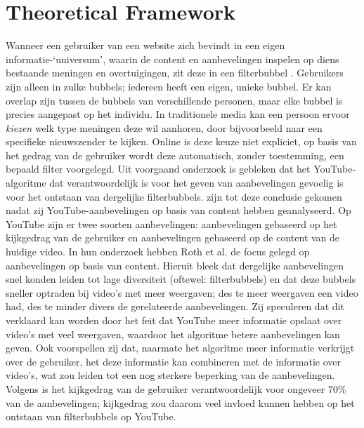 \documentclass[../main.tex]{subfiles}
\begin{document}
\section{Theoretical Framework}
Wanneer een gebruiker van een website zich bevindt in een eigen informatie-‘universum’, waarin de content en aanbevelingen inspelen op diens bestaande meningen en overtuigingen, zit deze in een filterbubbel \citep{pariser2011filter}. Gebruikers zijn alleen in zulke bubbels; iedereen heeft een eigen, unieke bubbel. Er kan overlap zijn tussen de bubbels van verschillende personen, maar elke bubbel is precies aangepast op het individu. In traditionele media kan een persoon ervoor \textit{kiezen} welk type meningen deze wil aanhoren, door bijvoorbeeld naar een specifieke nieuwszender te kijken. Online is deze keuze niet expliciet, op basis van het gedrag van de gebruiker wordt deze automatisch, zonder toestemming, een bepaald filter voorgelegd. Uit voorgaand onderzoek is gebleken dat het YouTube-algoritme dat verantwoordelijk is voor het geven van aanbevelingen gevoelig is voor het ontstaan van dergelijke filterbubbels. \citet{roth2020tubes} zijn tot deze conclusie gekomen nadat zij YouTube-aanbevelingen op basis van content hebben geanalyseerd. Op YouTube zijn er twee soorten aanbevelingen: aanbevelingen gebaseerd op het kijkgedrag van de gebruiker en aanbevelingen gebaseerd op de content van de huidige video. In hun onderzoek hebben Roth et al. de focus gelegd op aanbevelingen op basis van content. Hieruit bleek dat dergelijke aanbevelingen snel konden leiden tot lage diversiteit (oftewel: filterbubbels) en dat deze bubbels sneller optraden bij video’s met meer weergaven; des te meer weergaven een video had, des te minder divers de gerelateerde aanbevelingen. Zij speculeren dat dit verklaard kan worden door het feit dat YouTube meer informatie opslaat over video’s met veel weergaven, waardoor het algoritme betere aanbevelingen kan geven. Ook voorspellen zij dat, naarmate het algoritme meer informatie verkrijgt over de gebruiker, het deze informatie kan combineren met de informatie over video’s, wat zou leiden tot een nog sterkere beperking van de aanbevelingen. Volgens \citet{ledwich2019algorithmic} is het kijkgedrag van de gebruiker verantwoordelijk voor ongeveer 70\% van de aanbevelingen; kijkgedrag zou daarom veel invloed kunnen hebben op het ontstaan van filterbubbels op YouTube.  
\end{document}
